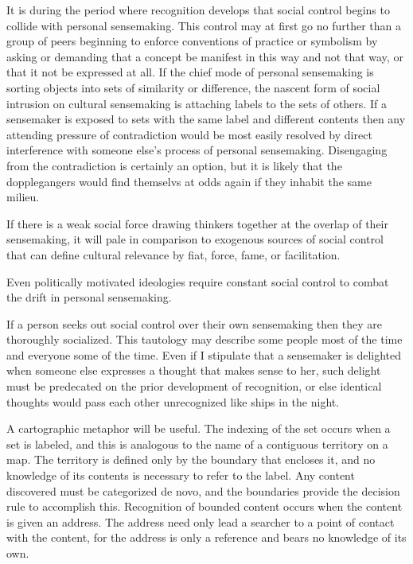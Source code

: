 \documentclass[]{article}
\begin{document}
It is during the period where recognition develops that social control
begins to collide with personal sensemaking. This control may at first
go no further than a group of peers beginning to enforce conventions of
practice or symbolism by asking or demanding that a concept be manifest
in this way and not that way, or that it not be expressed at all. If the
chief mode of personal sensemaking is sorting objects into sets of
similarity or difference, the nascent form of social intrusion on
cultural sensemaking is attaching labels to the sets of others. If a
sensemaker is exposed to sets with the same label and different contents
then any attending pressure of contradiction would be most easily
resolved by direct interference with someone else's process of personal
sensemaking. Disengaging from the contradiction is certainly an option,
but it is likely that the dopplegangers would find themselvs at odds
again if they inhabit the same milieu.

If there is a weak social force drawing thinkers together at the overlap
of their sensemaking, it will pale in comparison to exogenous sources of
social control that can define cultural relevance by fiat, force, fame,
or facilitation.

Even politically motivated ideologies require constant social control to
combat the drift in personal sensemaking.

If a person seeks out social control over their own sensemaking then
they are thoroughly socialized. This tautology may describe some people
most of the time and everyone some of the time. Even if I stipulate that
a sensemaker is delighted when someone else expresses a thought that
makes sense to her, such delight must be predecated on the prior
development of recognition, or else identical thoughts would pass each
other unrecognized like ships in the night.

A cartographic metaphor will be useful. The indexing of the set occurs
when a set is labeled, and this is analogous to the name of a contiguous
territory on a map. The territory is defined only by the boundary that
encloses it, and no knowledge of its contents is necessary to refer to
the label. Any content discovered must be categorized de novo, and the
boundaries provide the decision rule to accomplish this. Recognition of
bounded content occurs when the content is given an address. The address
need only lead a searcher to a point of contact with the content, for
the address is only a reference and bears no knowledge of its own.
\end{document}
